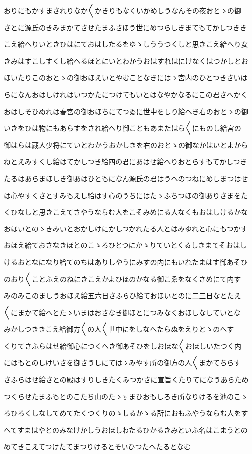\documentclass[a4paper,11pt,landscape]{ltjtarticle}
\begin{document}
\par\medskip
おりにもかすまされりなか〱かきりもなくいかめしうなんその夜おとゝの御
\par\medskip
さとに源氏のきみまかてさせたまふさほう世にめつらしきまてもてかしつきき
\par\medskip
こえ給へりいときひはにておはしたるをゆゝしううつくしと思きこえ給へり女
\par\medskip
きみはすこしすくし給へるほとにいとわかうおはすれはにけなくはつかしとお
\par\medskip
ほいたりこのおとゝの御おほえいとやむことなきにはゝ宮内のひとつきさいは
\par\medskip
らになんおはしけれはいつかたにつけてもいとはなやかなるにこの君さへかく
\par\medskip
おはしそひぬれは春宮の御おほちにてつゐに世中をしり給へき右のおとゝの御
\par\medskip
いきをひは物にもあらすをされ給へり御こともあまたはら〱にものし給宮の
\par\medskip
御はらは蔵人少将にていとわかうおかしきを右のおとゝの御なかはいとよから
\par\medskip
ねとえみすくし給はてかしつき給四の君にあはせ給へりおとらすもてかしつき
\par\medskip
たるはあらまほしき御あはひともになん源氏の君はうへのつねにめしまつはせ
\par\medskip
は心やすくさとすみもえし給はす心のうちにはたゝふちつほの御ありさまをた
\par\medskip
くひなしと思きこえてさやうならむ人をこそみめにる人なくもおはしけるかな
\par\medskip
おほいとのゝきみいとおかしけにかしつかれたる人とはみゆれと心にもつかす
\par\medskip
おほえ給ておさなきほとのこゝろひとつにかゝりていとくるしきまてそおはし
\par\medskip
けるおとなになり給てのちはありしやうにみすの内にもいれたまはす御あそひ
\par\medskip
のおり〱ことふえのねにきこえかよひほのかなる御こゑをなくさめにて内す
\par\medskip
みのみこのましうおほえ給五六日さふらひ給ておほいとのに二三日なとたえ
\par\medskip
〱にまかて給へとたゝいまはおさなき御ほとにつみなくおほしなしていとな
\par\medskip
みかしつききこえ給御方〱の人〱世中にをしなへたらぬをえりとゝのへす
\par\medskip
くりてさふらはせ給御心につくへき御あそひをしおほな〱おほしいたつく内
\par\medskip
にはもとのしけいさを御さうしにてはゝみやす所の御方の人〱まかてちらす
\par\medskip
さふらはせ給さとの殿はすりしきたくみつかさに宣旨くたりてになうあらため
\par\medskip
つくらせたまふもとのこたち山のたゝすまひおもしろき所なりけるを池のこゝ
\par\medskip
ろひろくしなしてめてたくつくりのゝしるかゝる所におもふやうならむ人をす
\par\medskip
へてすまはやとのみなけかしうおほしわたるひかるきみといふ名はこまうとの
\par\medskip
めてきこえてつけたてまつりけるとそいひつたへたるとなむ
\par\medskip
\end{document}
